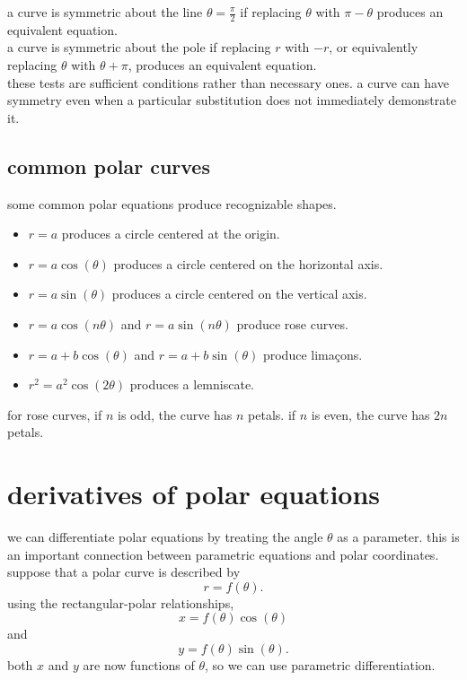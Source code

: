 \documentclass{article}
\begin{document}
a curve is symmetric about the line $\theta=\frac{\pi}{2}$ if replacing $\theta$ with $\pi-\theta$ produces an equivalent equation.\\

a curve is symmetric about the pole if replacing $r$ with $-r$, or equivalently replacing $\theta$ with $\theta+\pi$, produces an equivalent equation.\\

these tests are sufficient conditions rather than necessary ones. a curve can have symmetry even when a particular substitution does not immediately demonstrate it.\\

\subsection{common polar curves}

some common polar equations produce recognizable shapes.

\begin{itemize}
\item $r=a$ produces a circle centered at the origin.
\item $r=a\cos(\theta)$ produces a circle centered on the horizontal axis.
\item $r=a\sin(\theta)$ produces a circle centered on the vertical axis.
\item $r=a\cos(n\theta)$ and $r=a\sin(n\theta)$ produce rose curves.
\item $r=a+b\cos(\theta)$ and $r=a+b\sin(\theta)$ produce lima\c{c}ons.
\item $r^2=a^2\cos(2\theta)$ produces a lemniscate.
\end{itemize}

for rose curves, if $n$ is odd, the curve has $n$ petals. if $n$ is even, the curve has $2n$ petals.\\

\newpage

\section{derivatives of polar equations}

we can differentiate polar equations by treating the angle $\theta$ as a parameter. this is an important connection between parametric equations and polar coordinates.\\

suppose that a polar curve is described by
\[
r=f(\theta).
\]
using the rectangular-polar relationships,
\[
x=f(\theta)\cos(\theta)
\]
and
\[
y=f(\theta)\sin(\theta).
\]
both $x$ and $y$ are now functions of $\theta$, so we can use parametric differentiation.\\
\end{document}
